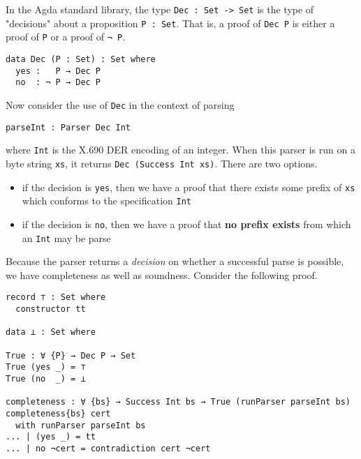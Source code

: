 \documentclass[11pt]{article}
\begin{document}
In the Agda standard library, the type \texttt{Dec : Set -> Set} is the type of
"decisions" about a proposition \texttt{P : Set}.
That is, a proof of \texttt{Dec P} is either a proof of \texttt{P} or a proof of \texttt{¬ P}.

\begin{verbatim}
data Dec (P : Set) : Set where
  yes :   P → Dec P
  no  : ¬ P → Dec P
\end{verbatim}

Now consider the use of \texttt{Dec} in the context of parsing

\begin{verbatim}
parseInt : Parser Dec Int
\end{verbatim}

where \texttt{Int} is the X.690 DER encoding of an integer.
When this parser is run on a byte string \texttt{xs}, it returns \texttt{Dec (Success Int
    xs)}. There are two options.
\begin{itemize}
\item if the decision is \texttt{yes}, then we have a proof that there exists some
prefix of \texttt{xs} which conforms to the specification \texttt{Int}

\item if the decision is \texttt{no}, then we have a proof that \textbf{no prefix exists}
from which an \texttt{Int} may be parse
\end{itemize}


Because the parser returns a \emph{decision} on whether a successful parse is
possible, we have completeness as well as soundness.
Consider the following proof.

\begin{verbatim}
record ⊤ : Set where
  constructor tt

data ⊥ : Set where

True : ∀ {P} → Dec P → Set
True (yes _) = ⊤
True (no  _) = ⊥

completeness : ∀ {bs} → Success Int bs → True (runParser parseInt bs)
completeness{bs} cert
  with runParser parseInt bs
... | (yes _) = tt
... | no ¬cert = contradiction cert ¬cert
\end{verbatim}
\end{document}
